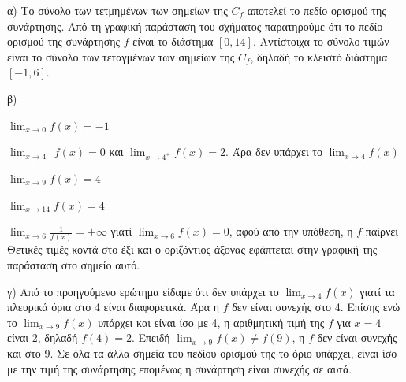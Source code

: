 \begin{alist}
\item α) Το σύνολο των τετμημένων των σημείων της $C_f$ αποτελεί το πεδίο ορισμού της συνάρτησης. Από τη γραφική παράσταση του σχήματος παρατηρούμε ότι το πεδίο ορισμού της συνάρτησης $f$ είναι το διάστημα $[0,14]$. Αντίστοιχα το σύνολο τιμών είναι το σύνολο των τεταγμένων των σημείων της $C_f$, δηλαδή το κλειστό διάστημα $[-1,6]$.
\item β)
    \begin{rlist}
    \item $\lim_{x \to 0} f(x) = -1$
    \item $\lim_{x \to 4^-} f(x) = 0$ και $\lim_{x \to 4^+} f(x) = 2$. Άρα δεν υπάρχει το $\lim_{x \to 4} f(x)$
    \item $\lim_{x \to 9} f(x) = 4$
    \item $\lim_{x \to 14} f(x) = 4$
    \item $\lim_{x \to 6} \frac{1}{f(x)} = +\infty$ γιατί $\lim_{x \to 6} f(x) = 0$, αφού από την υπόθεση, η $f$ παίρνει Θετικές τιμές κοντά στο έξι και ο οριζόντιος άξονας εφάπτεται στην γραφική της παράσταση στο σημείο αυτό.
    \end{rlist}
\item γ) Από το προηγούμενο ερώτημα είδαμε ότι δεν υπάρχει το $\lim_{x \to 4} f(x)$ γιατί τα πλευρικά όρια στο 4 είναι διαφορετικά. Άρα η $f$ δεν είναι συνεχής στο 4.
Επίσης ενώ το $\lim_{x \to 9} f(x)$ υπάρχει και είναι ίσο με 4, η αριθμητική τιμή της $f$ για $x=4$ είναι 2, δηλαδή $f(4)=2$. Επειδή $\lim_{x \to 9} f(x) \neq f(9)$, η $f$ δεν είναι συνεχής και στο 9. Σε όλα τα άλλα σημεία του πεδίου ορισμού της το όριο υπάρχει, είναι ίσο με την τιμή της συνάρτησης επομένως η συνάρτηση είναι συνεχής σε αυτά.
\end{alist}